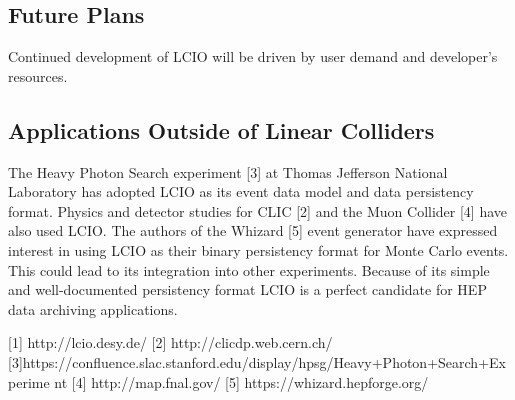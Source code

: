 \subsection{Future Plans}
Continued development of LCIO will be driven by user demand and developer’s resources.


\subsection{Applications Outside of Linear Colliders}
The Heavy Photon Search experiment [3] at Thomas Jefferson National Laboratory
has adopted LCIO as its event data model and data persistency format. Physics
and detector studies for CLIC [2] and the Muon Collider [4] have also used LCIO.
The authors of the Whizard [5] event generator have expressed interest in using
LCIO as their binary persistency format for Monte Carlo events. This could lead
to its integration into other experiments. Because of its simple and
well-documented persistency format LCIO is a perfect candidate for HEP data
archiving applications.


[1] http://lcio.desy.de/
[2] http://clicdp.web.cern.ch/
[3]https://confluence.slac.stanford.edu/display/hpsg/Heavy+Photon+Search+Experime nt
[4] http://map.fnal.gov/
[5] https://whizard.hepforge.org/
